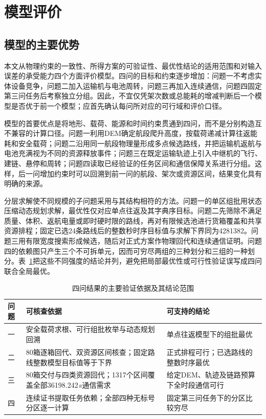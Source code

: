 \section{模型评价}
\subsection{模型的主要优势}
本文从物理约束的一致性、所得方案的可验证性、最优性结论的适用范围和对输入误差的承受能力四个方面评价模型。四问的目标和约束逐步增加：问题一不考虑实体设备竞争，问题二加入运输机与电池周转，问题三再加入连续通信，问题四固定第三问任务后考察独立分组。因此，不宜仅凭架次数或总能耗的增减判断后一个模型是否优于前一个模型；应首先确认每问所对应的可行域和评价口径。

模型的首要优点是将地形、载荷、能源和时间约束贯通到四问，而不是分别构造互不兼容的计算口径。问题一利用DEM确定航段爬升高度，按载荷递减计算往返能耗和安全载荷；问题二沿用同一航段物理量形成多点候选路线，并把运输机返航与电池充满视为不同的资源释放事件；问题三在既定运输轨迹上引入中继机的飞行、建链、悬停和周转；问题四读取已经验证的任务区间和通信保障关系进行分组。这样，后一问增加约束时可以回溯到前一问的航段、架次或资源区间，结果变化具有明确的来源。

分层求解使不同规模的子问题采用与其结构相符的方法。问题一的单区组批用状态压缩动态规划求解，最优性仅对应单点往返及其字典序目标。问题二先筛除不满足质量、体积、返航电量或即时硬时限的路线，再对有限候选池进行货箱覆盖和共享资源排程；固定已选24条路线后的整数秒时序目标值与求解下界同为4281382。问题三用有限宽度搜索形成候选，随后对正式方案作物理回代和连续通信证明。问题四的依赖图只产生三个不可拆单元，因而可穷尽两组的三种划分和三组的一种划分。表~\ref{tab:model-eval-scope}把这些不同强度的结论并列，避免把局部最优性或可行性验证误写成四问联合全局最优。

\begin{table}[htbp]
\centering\small
\caption{四问结果的主要验证依据及其结论范围}
\label{tab:model-eval-scope}
\begin{tabular}{@{}p{}p{}p{}@{}}
\toprule
问题 & 可核查依据 & 可支持的结论\\
\midrule
一 & 安全载荷求根、可行组批枚举与动态规划回溯 & 单点往返模型下的组批最优\\
二 & 80箱逐箱回代、双资源区间核查；固定路线整数模型目标值等于下界 & 正式排程可行；已选路线的整数时序最优\\
三 & 80箱交付与四类资源回代；1317个区间覆盖全部36198.242\,s通信需求 & 给定DEM、轨迹及链路预算下全时段通信可行\\
四 & 连续证书提取任务依赖；全部四种无标号分区逐一计算 & 固定第三问任务下的分区比较穷尽\\
\bottomrule
\end{tabular}
\end{table}

